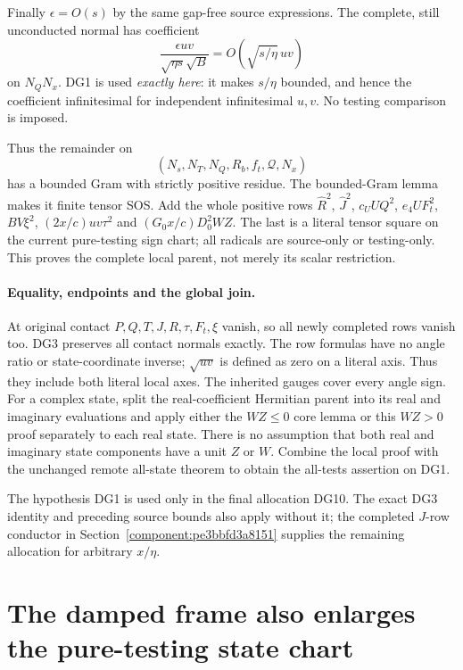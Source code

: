 Finally $\epsilon=O(s)$ by the same gap-free source expressions.
The complete, still unconducted normal has coefficient
\[
 \frac{\epsilon uv}{\sqrt{\eta s}\sqrt B}
         =O\!\left(\sqrt{s/\eta}\,uv\right)          \tag{DG10}
\]
on $N_QN_x$. DG1 is used \emph{exactly here}: it makes $s/\eta$
bounded, and hence the coefficient infinitesimal for independent
infinitesimal $u,v$. No testing comparison is imposed.

Thus the remainder on
\[
                  (N_s,N_T,N_Q,R_b,f_t,\mathcal Q,N_x)
\]
has a bounded Gram with strictly positive residue. The bounded-Gram
lemma makes it finite tensor SOS. Add the whole positive rows
$\widehat R^2$, $\widehat J^2$, $c_UUQ^2$, $e_4UF_t^2$,
$BV\xi^2$, $(2x/c)uv\tau^2$ and
$(G_0x/c)D_0^2WZ$. The last is a literal tensor square on the current
pure-testing sign chart; all radicals are source-only or testing-only.
This proves the complete local parent, not merely its scalar
restriction.

\paragraph{Equality, endpoints and the global join.}
At original contact $P,Q,T,J,R,\tau,F_t,\xi$ vanish, so all newly
completed rows vanish too. DG3 preserves all contact normals exactly.
The row formulas have no angle ratio or state-coordinate inverse;
$\sqrt{uv}$ is defined as zero on a literal axis. Thus they include
both literal local axes. The inherited gauges cover every angle sign.
For a complex state, split the real-coefficient Hermitian parent into
its real and imaginary evaluations and apply either the $WZ\le0$
core lemma or this $WZ>0$ proof separately to each real state. There
is no assumption that both real and imaginary state components have
a unit $Z$ or $W$. Combine the local proof with the unchanged remote
all-state theorem to obtain the all-tests assertion on DG1.

The hypothesis DG1 is used only in the final allocation DG10. The exact DG3 identity and preceding source bounds also apply without it; the completed $J$-row conductor in Section~\ref{component:pe3bbfd3a8151} supplies the remaining allocation for arbitrary $x/\eta$.


\section{\texorpdfstring{The damped frame also enlarges the pure-testing state chart}{The damped frame also enlarges the pure-testing state chart}}
\label{component:p8cfada778490}

